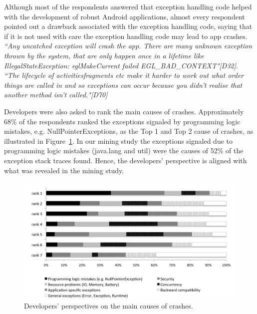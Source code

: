 Although most of the respondents answered that exception handling code helped with the development of robust Android applications, almost every respondent pointed out a drawback associated with the exception handling code, saying that if it is not used with care the exception handling code may lead to app crashes. \emph{``Any uncatched exception will crash the app. There are many unknown exception thrown by the system, that are only happen once in a lifetime like IllegalStateException: eglMakeCurrent failed EGL\_BAD\_CONTEXT"[D32]}. \emph{``The lifecycle of activities\/fragments etc make it harder to work out what order things are called in and so exceptions can occur because you didn't realise that another method isn't called."[D70]}


Developers were also asked to rank the main causes of crashes. Approximately 68\% of the respondents ranked the exceptions signaled by programming logic mistakes, e.g. NullPointerExceptions, as the Top 1 and Top 2 cause of crashes, as illustrated in Figure~\ref{fig:ranking}. In our mining study the exceptions signaled due to programming logic mistakes (java.lang and util) were the causes of 52\% of the exception stack traces found. Hence, the developers' perspective is aligned with what was revealed in the mining study.
\begin{figure} 
\centering \includegraphics[scale=0.60]{ranking.png}
\caption{Developers' perspectives on the main causes of crashes.}\label{fig:ranking} 
\end{figure}


